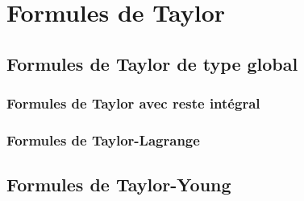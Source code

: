 \chapter{Formules de Taylor}

\section{Formules de Taylor de type global}

\subsection{Formules de Taylor avec reste intégral}

\subsection{Formules de Taylor-Lagrange}

\section{Formules de Taylor-Young}
